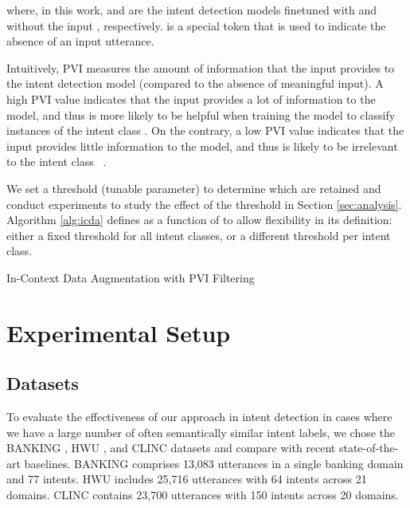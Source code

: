 \documentclass[11pt]{article}
\begin{document}
where, in this work,  and  are the intent detection models finetuned with and without the input , respectively. 
 is a special token that is used to indicate the absence of an input utterance.

Intuitively, PVI measures the amount of information that the input  provides to the intent detection model (compared to the absence of meaningful input).
A high PVI value indicates that the input   provides a lot of information to the model, and thus is more likely to be helpful when training the model to classify instances of the intent class . 
On the contrary, a low PVI value indicates that the input  provides little information to the model, and thus is likely to be irrelevant to the intent \mbox{class } \cite{DBLP:conf/icml/EthayarajhCS22}. 

We set a threshold  (tunable parameter) to determine which  are retained and conduct experiments to study the effect of the threshold in Section \ref{sec:analysis}. Algorithm \ref{alg:icda} defines  as a function of  to allow flexibility in its definition: either a fixed threshold for all intent classes, or a different threshold per intent class.

\begin{algorithm}[t]
\caption{In-Context Data Augmentation with PVI Filtering}
\label{alg:icda}
\DontPrintSemicolon
  \KwOutput{}
  
  
  
  
  
  
  
  
  
  
  
  \For{  }
  { 
    
  }
  
  
  
  
\end{algorithm}


\section{Experimental Setup}
\label{sec:experiment}

\subsection{Datasets}
To evaluate the effectiveness of our approach in intent detection in cases where we have a large number of often semantically similar intent labels, we chose the BANKING \cite{casanueva-etal-2020-efficient}, HWU \cite{DBLP:conf/iwsds/LiuESR19}, and CLINC \cite{larson-etal-2019-evaluation} datasets and compare with recent state-of-the-art baselines.
BANKING comprises 13,083 utterances in a single banking domain and 77 intents. 
HWU includes 25,716 utterances with 64 intents across 21 domains. 
CLINC contains 23,700 utterances with 150 intents across 20 domains.
\end{document}
